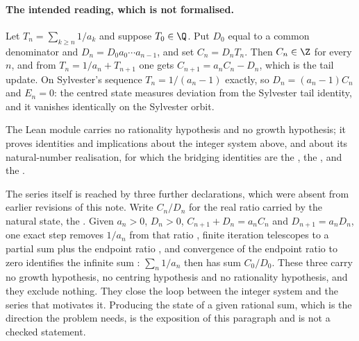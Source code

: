 \documentclass[11pt]{article}
\begin{document}
\paragraph{The intended reading, which is not formalised.}
Let $T_n=\sum_{k\ge n}1/a_k$ and suppose $T_0\in\Q$.  Put $D_0$ equal to a
common denominator and $D_n=D_0a_0\cdots a_{n-1}$, and set $C_n=D_nT_n$.  Then
$C_n\in\Z$ for every $n$, and from $T_n=1/a_n+T_{n+1}$ one gets
$C_{n+1}=a_nC_n-D_n$, which is the tail update.  On Sylvester's sequence
$T_n=1/(a_n-1)$ exactly, so $D_n=(a_n-1)C_n$ and $E_n=0$: the centred state
measures deviation from the Sylvester tail identity, and it vanishes
identically on the Sylvester orbit.

The Lean module carries no rationality hypothesis and no growth hypothesis; it
proves identities and implications about the integer system above, and about its
natural-number realisation, for which the bridging identities are the
, the
, and the
.

The series itself is reached by three further declarations, which were absent
from earlier revisions of this note.  Write $C_n/D_n$ for the real ratio carried
by the natural state, the
.
Given $a_n>0$, $D_n>0$, $C_{n+1}+D_n=a_nC_n$ and $D_{n+1}=a_nD_n$, one exact
step removes $1/a_n$ from that ratio
, finite iteration telescopes to a partial sum plus the
endpoint ratio
, and convergence of the endpoint ratio to zero identifies the
infinite sum
: $\sum_n1/a_n$ then has sum $C_0/D_0$.  These three carry no
growth hypothesis, no centring hypothesis and no rationality hypothesis, and
they exclude nothing.  They close the loop between the integer system and the
series that motivates it.  Producing the state of a given rational sum, which is
the direction the problem needs, is the exposition of this paragraph and is not a
checked statement.
\end{document}
